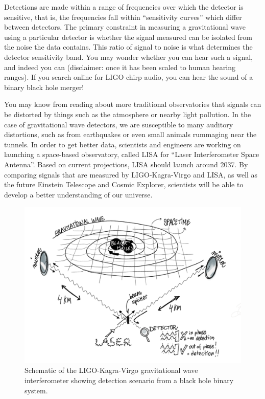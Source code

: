 Detections are made within a range of frequencies over which the detector is sensitive, that is, the frequencies fall within ``sensitivity curves'' which differ between detectors. The primary constraint in measuring a gravitational wave using a particular detector is whether the signal measured can be isolated from the noise the data contains. This ratio of signal to noise is what determines the detector sensitivity band. You may wonder whether you can hear such a signal, and indeed you can (disclaimer: once it has been scaled to human hearing ranges). If you search online for LIGO chirp audio, you can hear the sound of a binary black hole merger!

You may know from reading about more traditional observatories that signals can be distorted by things such as the atmosphere or nearby light pollution. In the case of gravitational wave detectors, we are susceptible to many auditory distortions, such as from earthquakes or even small animals rummaging near the tunnels. In order to get better data, scientists and engineers are working on launching a space-based observatory, called LISA for ``Laser Interferometer Space Antenna''. Based on current projections, LISA should launch around 2037. By comparing signals that are measured by LIGO-Kagra-Virgo and LISA, as well as the future Einstein Telescope and Cosmic Explorer, scientists will be able to develop a better understanding of our universe.

\begin{figure}
    \centering
    \includegraphics[width=1\linewidth]{img/ligo.png}
    \caption{Schematic of the LIGO-Kagra-Virgo gravitational wave interferometer showing detection scenario from a black hole binary system.}
    \label{fig:ligo}
\end{figure}